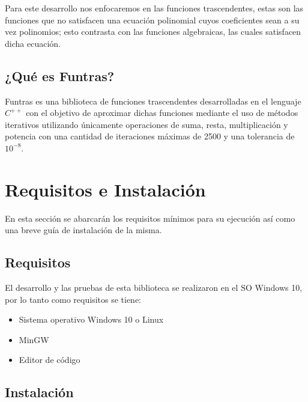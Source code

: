 \documentclass[10pt,a4paper]{article}
\begin{document}
	Para este desarrollo nos enfocaremos en las funciones trascendentes, estas son  las funciones que no satisfacen una ecuación polinomial cuyos coeficientes sean a su vez polinomios; esto contrasta con las funciones algebraicas, las cuales satisfacen dicha ecuación.
	
	\subsection{¿Qué es Funtras?}
	
	Funtras es una biblioteca de funciones trascendentes desarrolladas en el lenguaje $C^{++}$ con el
	objetivo de aproximar dichas funciones mediante el uso de métodos iterativos utilizando únicamente operaciones de suma, resta, multiplicación y potencia con una cantidad de iteraciones máximas de 2500 y una tolerancia de $10^{-8}$.
		
	\section{Requisitos e Instalación}
	
	En esta sección se abarcarán los requisitos mínimos para su ejecución así como una breve guía de instalación de la misma.
	
	\subsection{Requisitos}
	El desarrollo y las pruebas de esta biblioteca se realizaron en el SO Windows 10, por lo tanto como requisitos se tiene:
	
	\begin{itemize}
		\item Sistema operativo Windows 10 o Linux
		\item MinGW
		\item Editor de código
	\end{itemize}
	
	\subsection{Instalación}
	
\end{document}

